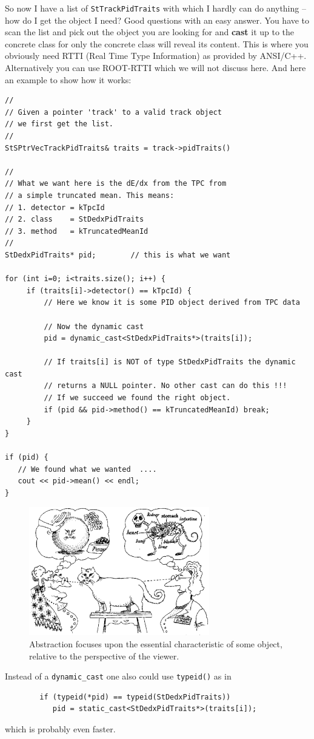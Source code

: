 \documentclass[twoside]{article}
\begin{document}
So now I have a list of \texttt{StTrackPidTraits} with which I hardly
can do anything -- how do I get the object I need? Good questions with
an easy answer. You have to scan the list and pick out the object you
are looking for and \textbf{cast} it up to the concrete class for only
the concrete class will reveal its content.  This is where you
obviously need RTTI (Real Time Type Information) as provided by
ANSI/C++. Alternatively you can use ROOT-RTTI which we will not
discuss here.  And here an example to show how it works:
\begin{verbatim}
//
// Given a pointer 'track' to a valid track object
// we first get the list.
//
StSPtrVecTrackPidTraits& traits = track->pidTraits()

//
// What we want here is the dE/dx from the TPC from
// a simple truncated mean. This means:
// 1. detector = kTpcId
// 2. class    = StDedxPidTraits
// 3. method   = kTruncatedMeanId
//
StDedxPidTraits* pid;        // this is what we want

for (int i=0; i<traits.size(); i++) {
     if (traits[i]->detector() == kTpcId) {
         // Here we know it is some PID object derived from TPC data

         // Now the dynamic cast
         pid = dynamic_cast<StDedxPidTraits*>(traits[i]);

         // If traits[i] is NOT of type StDedxPidTraits the dynamic cast
         // returns a NULL pointer. No other cast can do this !!!
         // If we succeed we found the right object.
         if (pid && pid->method() == kTruncatedMeanId) break;
     }
}

if (pid) {
   // We found what we wanted  ....
   cout << pid->mean() << endl;
}
\end{verbatim}
\begin{figure}[htb]
    \begin{center}
        \includegraphics[width=0.7\textwidth]{cartoon5.eps}
        \caption{Abstraction focuses upon the essential characteristic
            of some object, relative to the perspective of the
            viewer.}
    \end{center}
\end{figure}
Instead of a \texttt{dynamic\_cast} one also could use
\texttt{typeid()} as in
\begin{verbatim}
        if (typeid(*pid) == typeid(StDedxPidTraits))
           pid = static_cast<StDedxPidTraits*>(traits[i]);
\end{verbatim}
which is probably even faster.
\end{document}
